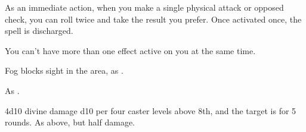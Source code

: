 \begin{spellheader}
\end{spellheader}
\begin{spelleffects}
    \spelleffect As an immediate action, when you make a single physical attack or opposed check, you can roll twice and take the result you prefer. Once activated once, the spell is discharged.
\end{spelleffects}
\begin{spellfooter}
    \spellnotes You can't have more than one  effect active on you at the same time.
\end{spellfooter}

\begin{comment}
\subsubsection{O-P}
\end{comment}

\begin{spellheader}
    \spelldur{\durshort}
\end{spellheader}
\begin{spelleffects}
    \spelleffect Fog blocks sight in the area, as .
\end{spelleffects}
\begin{spellfooter}
    \spellnotes As .
\end{spellfooter}

\begin{spellheader}
    \spellrng{\rngmed}
\end{spellheader}
\begin{spelleffects}
    \spellsuccess 4d10 divine damage \add d10 per four caster levels above 8th, and the target is \bewildered for 5 rounds.
    \spellfailure As above, but half damage.
\end{spelleffects}
\begin{spellfooter}

\end{spellfooter}

